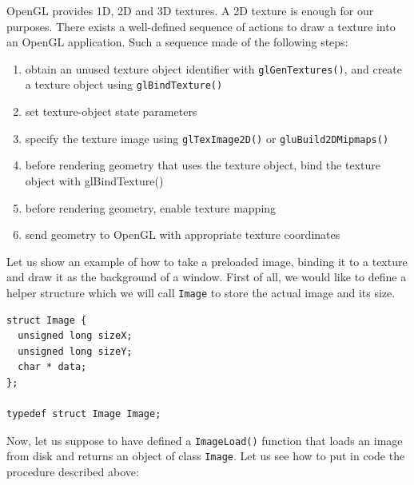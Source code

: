 %
OpenGL provides 1D, 2D and 3D textures. A 2D texture is enough for our
purposes.
%
There exists a well-defined sequence of actions to draw a texture 
into an OpenGL application. Such a sequence made of the following steps:
\begin{enumerate}
\item obtain an unused texture object identifier with \texttt{glGenTextures()}, 
  and create a texture object using \texttt{glBindTexture()}
\item set texture-object state parameters
\item specify the texture image using \texttt{glTexImage2D()} 
  or \texttt{gluBuild2DMipmaps()}
\item before rendering geometry that uses the texture object, 
  bind the texture object with glBindTexture()
\item before rendering geometry, enable texture mapping
\item send geometry to OpenGL with appropriate texture 
  coordinates
\end{enumerate}
%
Let us show an example of how to take a preloaded image, binding it 
to a texture and draw it as the background of a window. First of all, 
we would like to define a helper structure which we will call \texttt{Image}
to store the actual image and its size.
%
\begin{lstlisting}[caption={The Image structure}, label={code:image}, frame=trBL]
struct Image {
  unsigned long sizeX;
  unsigned long sizeY;
  char * data;
};

typedef struct Image Image;
\end{lstlisting}
%
Now, let us suppose to have defined a \texttt{ImageLoad()} function 
that loads an image from disk and returns an object of class \texttt{Image}. 
Let us see how to put in code the procedure described above:
%
